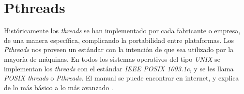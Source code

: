 

\chapter{Pthreads}
\label{appendix:pthread}

Históricamente los \textit{threads} se han implementado por cada fabricante o empresa, de una manera específica, complicando la portabilidad entre plataformas. Los \textit{Pthreads} nos proveen un estándar con la intención de que sea utilizado por la mayoría de máquinas. En todos los sistemas operativos del tipo \textit{UNIX} se implementan los \textit{threads} con el estándar \textit{IEEE POSIX 1003.1c}, y se les llama \textit{POSIX threads} o \textit{Pthreads}. El manual se puede encontrar en internet, y explica de lo más básico a lo más avanzado \cite{barney2009posix}.
\bigskip











